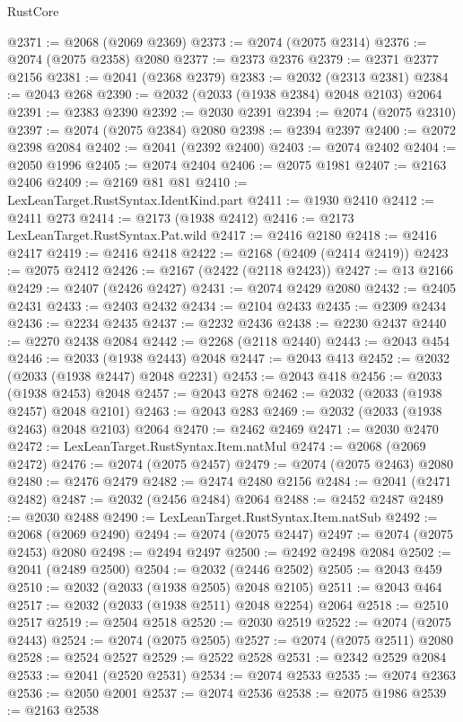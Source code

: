 \begin{lexlean}{RustCore}
\begin{coremodule}
@2371 := @2068 (@2069 @2369)
@2373 := @2074 (@2075 @2314)
@2376 := @2074 (@2075 @2358) @2080
@2377 := @2373 @2376
@2379 := @2371 @2377 @2156
@2381 := @2041 (@2368 @2379)
@2383 := @2032 (@2313 @2381)
@2384 := @2043 @268
@2390 := @2032 (@2033 (@1938 @2384) @2048 @2103) @2064
@2391 := @2383 @2390
@2392 := @2030 @2391
@2394 := @2074 (@2075 @2310)
@2397 := @2074 (@2075 @2384) @2080
@2398 := @2394 @2397
@2400 := @2072 @2398 @2084
@2402 := @2041 (@2392 @2400)
@2403 := @2074 @2402
@2404 := @2050 @1996
@2405 := @2074 @2404
@2406 := @2075 @1981
@2407 := @2163 @2406
@2409 := @2169 @81 @81
@2410 := LexLeanTarget.RustSyntax.IdentKind.part
@2411 := @1930 @2410
@2412 := @2411 @273
@2414 := @2173 (@1938 @2412)
@2416 := @2173 LexLeanTarget.RustSyntax.Pat.wild
@2417 := @2416 @2180
@2418 := @2416 @2417
@2419 := @2416 @2418
@2422 := @2168 (@2409 (@2414 @2419))
@2423 := @2075 @2412
@2426 := @2167 (@2422 (@2118 @2423))
@2427 := @13 @2166
@2429 := @2407 (@2426 @2427)
@2431 := @2074 @2429 @2080
@2432 := @2405 @2431
@2433 := @2403 @2432
@2434 := @2104 @2433
@2435 := @2309 @2434
@2436 := @2234 @2435
@2437 := @2232 @2436
@2438 := @2230 @2437
@2440 := @2270 @2438 @2084
@2442 := @2268 (@2118 @2440)
@2443 := @2043 @454
@2446 := @2033 (@1938 @2443) @2048
@2447 := @2043 @413
@2452 := @2032 (@2033 (@1938 @2447) @2048 @2231)
@2453 := @2043 @418
@2456 := @2033 (@1938 @2453) @2048
@2457 := @2043 @278
@2462 := @2032 (@2033 (@1938 @2457) @2048 @2101)
@2463 := @2043 @283
@2469 := @2032 (@2033 (@1938 @2463) @2048 @2103) @2064
@2470 := @2462 @2469
@2471 := @2030 @2470
@2472 := LexLeanTarget.RustSyntax.Item.natMul
@2474 := @2068 (@2069 @2472)
@2476 := @2074 (@2075 @2457)
@2479 := @2074 (@2075 @2463) @2080
@2480 := @2476 @2479
@2482 := @2474 @2480 @2156
@2484 := @2041 (@2471 @2482)
@2487 := @2032 (@2456 @2484) @2064
@2488 := @2452 @2487
@2489 := @2030 @2488
@2490 := LexLeanTarget.RustSyntax.Item.natSub
@2492 := @2068 (@2069 @2490)
@2494 := @2074 (@2075 @2447)
@2497 := @2074 (@2075 @2453) @2080
@2498 := @2494 @2497
@2500 := @2492 @2498 @2084
@2502 := @2041 (@2489 @2500)
@2504 := @2032 (@2446 @2502)
@2505 := @2043 @459
@2510 := @2032 (@2033 (@1938 @2505) @2048 @2105)
@2511 := @2043 @464
@2517 := @2032 (@2033 (@1938 @2511) @2048 @2254) @2064
@2518 := @2510 @2517
@2519 := @2504 @2518
@2520 := @2030 @2519
@2522 := @2074 (@2075 @2443)
@2524 := @2074 (@2075 @2505)
@2527 := @2074 (@2075 @2511) @2080
@2528 := @2524 @2527
@2529 := @2522 @2528
@2531 := @2342 @2529 @2084
@2533 := @2041 (@2520 @2531)
@2534 := @2074 @2533
@2535 := @2074 @2363
@2536 := @2050 @2001
@2537 := @2074 @2536
@2538 := @2075 @1986
@2539 := @2163 @2538

\end{coremodule}
\end{lexlean}
